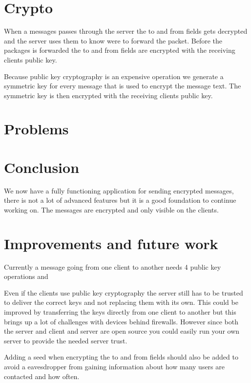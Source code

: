 \documentclass[twocolumn,11pt]{IEEEtran}
\begin{document}
 \section{Crypto}
When a messages passes through the server the to and from fields gets decrypted and the server uses them to know were to forward the packet. Before the packages is forwarded the to and from fields are encrypted with the receiving clients public key.

 Because public key cryptography is an expensive operation we generate a symmetric key for every message that is used to encrypt the message text. The symmetric key is then encrypted with the receiving clients public key. 

\section{Problems}
\label{sec:problems}


\section {Conclusion}
\label{sec:conclusion}
We now have a fully functioning application for sending encrypted messages, there is not a lot of advanced features but it is a good foundation to continue working on. The messages are encrypted and only visible on the clients.

\section {Improvements and future work}
\label{sec:improve}
Currently a message going from one client to another needs 4 public key operations and 

Even if the clients use public key cryptography the server still has to be trusted to deliver the correct keys and not replacing them with its own. This could be improved by transferring the keys directly from one client to another but this brings up a lot of challenges with devices behind firewalls. However since both the server and client and server are open source you could easily run your own server to provide the needed server trust.

Adding a seed when encrypting the to and from fields should also be added to avoid a eavesdropper from gaining information about how many users are contacted and how often. 

%
%
\end{document}
